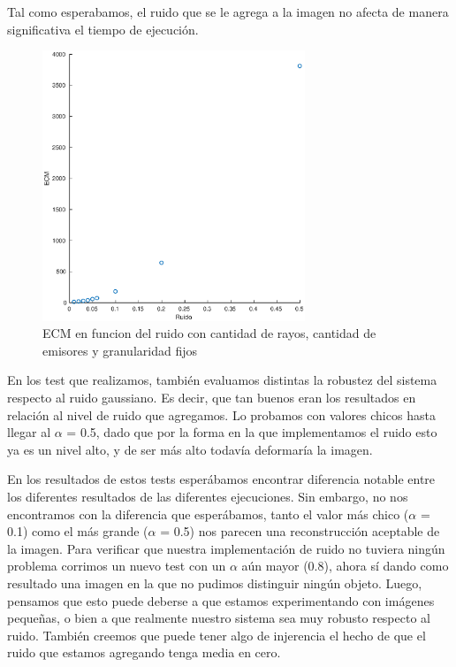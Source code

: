 \par Tal como esperabamos, el ruido que se le agrega a la imagen no afecta de manera significativa el tiempo de ejecuci\'on.

\begin{figure}[H]
	\centering	\includegraphics[width=0.7\textwidth]{img/ruido_ecm}
	\caption{ECM en funcion del ruido con cantidad de rayos, cantidad de emisores y granularidad fijos}
	\label{fig:ruido_ecm}
\end{figure}

\par En los test que realizamos, también evaluamos distintas la robustez del sistema respecto al ruido gaussiano. Es decir, que tan buenos eran los resultados en relación al nivel de ruido que agregamos.
Lo probamos con valores chicos hasta llegar al $\alpha$ = 0.5, dado que por la forma en la que implementamos el ruido esto ya es un nivel alto, y de ser más alto todavía deformaría la imagen.

\par En los resultados de estos tests esperábamos encontrar diferencia notable entre los diferentes resultados de las diferentes ejecuciones. Sin embargo, no nos encontramos con la diferencia que esperábamos, tanto el valor más chico ($\alpha$ = 0.1) como el más grande ($\alpha$ = 0.5) nos parecen una reconstrucción aceptable de la imagen.
Para verificar que nuestra implementación de ruido no tuviera ningún problema corrimos un nuevo test con un $\alpha$ aún mayor (0.8), ahora sí dando como resultado una imagen en la que no pudimos distinguir ningún objeto.
Luego, pensamos que esto puede deberse a que estamos experimentando con imágenes pequeñas, o bien a que realmente nuestro sistema sea muy robusto respecto al ruido. También creemos que puede tener algo de injerencia el hecho de que el ruido que estamos agregando tenga media en cero. 
